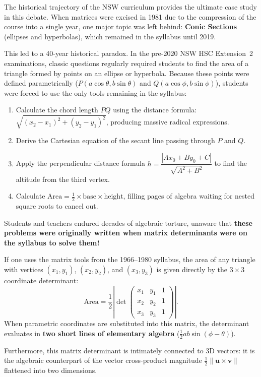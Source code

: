 \documentclass[12pt]{article}
\begin{document}
The historical trajectory of the NSW curriculum provides the ultimate case study in this debate. When matrices were excised in 1981 due to the compression of the course into a single year, one major topic was left behind: \textbf{Conic Sections} (ellipses and hyperbolas), which remained in the syllabus until 2019.

This led to a 40-year historical paradox. In the pre-2020 NSW HSC Extension~2 examinations, classic questions regularly required students to find the area of a triangle formed by points on an ellipse or hyperbola. Because these points were defined parametrically ($P(a\cos\theta, b\sin\theta)$ and $Q(a\cos\phi, b\sin\phi)$), students were forced to use the only tools remaining in the syllabus:
\begin{enumerate}[leftmargin=*]
  \item Calculate the chord length $PQ$ using the distance formula: $\sqrt{(x_2-x_1)^2 + (y_2-y_1)^2}$, producing massive radical expressions.
  \item Derive the Cartesian equation of the secant line passing through $P$ and $Q$.
  \item Apply the perpendicular distance formula $h = \dfrac{|Ax_0 + By_0 + C|}{\sqrt{A^2 + B^2}}$ to find the altitude from the third vertex.
  \item Calculate $\text{Area} = \frac{1}{2} \times \text{base} \times \text{height}$, filling pages of algebra waiting for nested square roots to cancel out.
\end{enumerate}

Students and teachers endured decades of algebraic torture, unaware that \textbf{these problems were originally written when matrix determinants were on the syllabus to solve them!}

If one uses the matrix tools from the 1966--1980 syllabus, the area of any triangle with vertices $(x_1, y_1)$, $(x_2, y_2)$, and $(x_3, y_3)$ is given directly by the $3 \times 3$ coordinate determinant:
\[
\text{Area} = \frac{1}{2} \left| \det \begin{pmatrix} x_1 & y_1 & 1 \\ x_2 & y_2 & 1 \\ x_3 & y_3 & 1 \end{pmatrix} \right|.
\]
When parametric coordinates are substituted into this matrix, the determinant evaluates in \textbf{two short lines of elementary algebra} ($\frac{1}{2}ab\sin(\phi - \theta)$). 

Furthermore, this matrix determinant is intimately connected to 3D vectors: it is the algebraic counterpart of the vector cross-product magnitude $\frac{1}{2}\|\mathbf{u} \times \mathbf{v}\|$ flattened into two dimensions.
\end{document}
